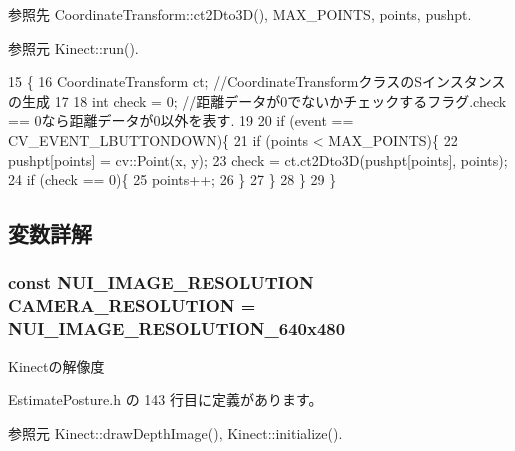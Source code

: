 参照先 Coordinate\-Transform\-::ct2\-Dto3\-D(), M\-A\-X\-\_\-\-P\-O\-I\-N\-T\-S, points, pushpt.



参照元 Kinect\-::run().


\begin{DoxyCode}
15 \{
16     CoordinateTransform ct; \textcolor{comment}{//CoordinateTransformクラスのSインスタンスの生成}
17 
18     \textcolor{keywordtype}{int} check = 0; \textcolor{comment}{//距離データが0でないかチェックするフラグ.check == 0なら距離データが0以外を表す.}
19 
20     \textcolor{keywordflow}{if} (event == CV\_EVENT\_LBUTTONDOWN)\{
21         \textcolor{keywordflow}{if} (points < MAX_POINTS)\{
22             pushpt[points] = cv::Point(x, y);
23             check = ct.ct2Dto3D(pushpt[points], points);
24             \textcolor{keywordflow}{if} (check == 0)\{
25                 points++;
26             \}
27         \}
28     \}
29 \}\end{DoxyCode}


\subsection{変数詳解}
\subsubsection[{C\-A\-M\-E\-R\-A\-\_\-\-R\-E\-S\-O\-L\-U\-T\-I\-O\-N}]{\setlength{\rightskip}{0pt plus 5cm}const N\-U\-I\-\_\-\-I\-M\-A\-G\-E\-\_\-\-R\-E\-S\-O\-L\-U\-T\-I\-O\-N C\-A\-M\-E\-R\-A\-\_\-\-R\-E\-S\-O\-L\-U\-T\-I\-O\-N = N\-U\-I\-\_\-\-I\-M\-A\-G\-E\-\_\-\-R\-E\-S\-O\-L\-U\-T\-I\-O\-N\-\_\-640x480}\label{_estimate_posture_8h_ac0e005483bfce51f732e38048c0b1898}


Kinectの解像度 



 Estimate\-Posture.\-h の 143 行目に定義があります。



参照元 Kinect\-::draw\-Depth\-Image(), Kinect\-::initialize().

